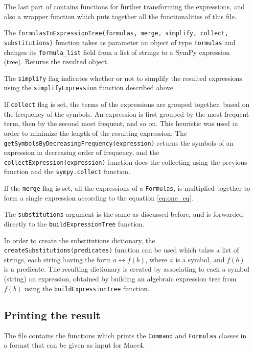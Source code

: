 The last part of  contains functions for further transforming the expressions, and also a wrapper function which puts together all the functionalities of this file.

The \verb|formulasToExpressionTree(formulas, merge, simplify, collect, substitutions)| function takes as parameter an object of type \verb|Formulas| and changes its \verb|formula_list| field from a list of strings to a SymPy expression (tree). Returns the resulted object.

The \verb|simplify| flag indicates whether or not to simplify the resulted expressions using the \verb|simplifyExpression| function described above

If \verb|collect| flag is set, the terms of the expressions are grouped together, based on the frequency of the symbols. An expression is first grouped by the most frequent term, then by the second most frequent, and so on. This heuristic was used in order to minimize the length of the resulting expression. The \verb|getSymbolsByDecreasingFrequency(expression)| returns the symbols of an expression in decreasing order of frequency, and the \verb|collectExpression(expression)| function does the collecting using the previous function and the \verb|sympy.collect| function.

If the \verb|merge| flag is set, all the expressions of a \verb|Formulas|, is multiplied together to form a single expression according to the equation \ref{eq:one_eq}.

The \verb|substitutions| argument is the same as discussed before, and is forwarded directly to the \verb|buildExpressionTree| function. 

In order to create the substitutions dictionary, the \verb|createSubstitutions(predicates)| function can be used which takes a list of strings, each string having the form $a \leftrightarrow f(b)$, where $a$ is a symbol, and $f(b)$ is a predicate. The resulting dictionary is created by associating to each $a$ symbol (string) an expression, obtained by building an algebraic expression tree from $f(b)$ using the \verb|buildExpressionTree| function.




\subsection{Printing the result}

The  file contains the functions which prints the \verb|Command| and \verb|Formulas| classes in a format that can be given as input for Mace4.


